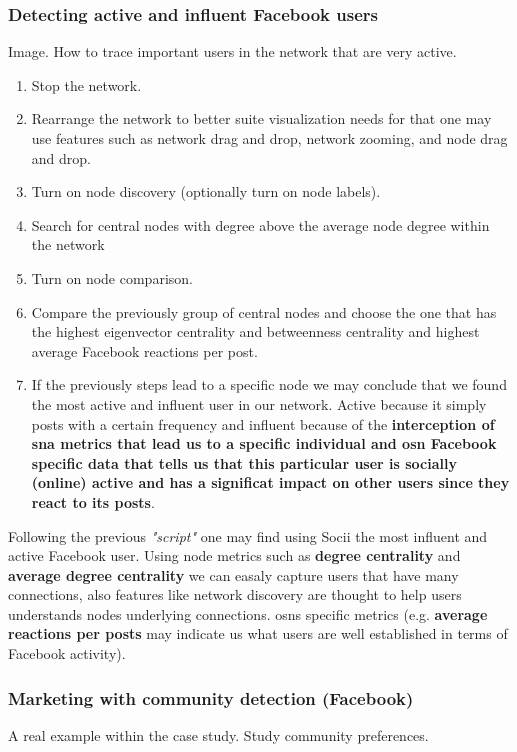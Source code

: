 \subsubsection{Detecting active and influent Facebook users}
Image. How to trace important users in the network that are very active.
\begin{enumerate}
    \item Stop the network.
    \item Rearrange the network to better suite visualization needs for that one may use features such as network drag and drop, network zooming, and node drag and drop.
    \item Turn on node discovery (optionally turn on node labels).
    \item Search for central nodes with degree above the average node degree within the network
    \item Turn on node comparison.
    \item Compare the previously group of central nodes and choose the one that has the highest eigenvector centrality
    and betweenness centrality and highest average Facebook reactions per post.
    \item If the previously steps lead to a specific node we may conclude that we found the most active and influent user in our network. Active because it simply posts with a certain frequency and influent because of the \textbf{interception of \gls{sna} metrics that lead us to a specific individual and \gls{osn} Facebook specific data that tells us that this particular user is socially (online) active and has a significat impact on other users since they react to its posts}.
\end{enumerate}

Following the previous \textit{"script"} one may find using Socii the most influent and active Facebook user. Using node metrics such as \textbf{degree centrality} and \textbf{average degree centrality} we can easaly capture users that have many connections, also features like network discovery are thought to help users understands nodes underlying connections. \glspl{osn} specific metrics (e.g. \textbf{average reactions per posts} may indicate us what users are well established in terms of Facebook activity).

\subsubsection{Marketing with community detection (Facebook)}
A real example within the case study. Study community preferences.

